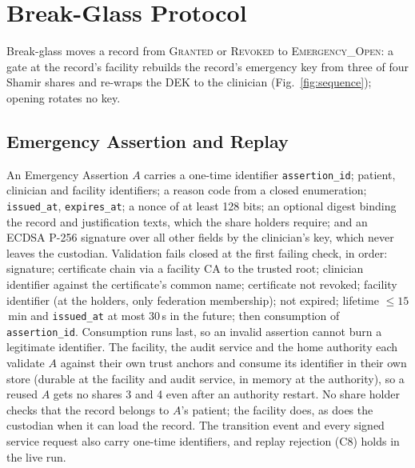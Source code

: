 \section{Break-Glass Protocol}\label{sec:breakglass}




Break-glass moves a record from \textsc{Granted} or \textsc{Revoked} to
\textsc{Emergency\_Open}: a gate at the record's facility rebuilds the
record's emergency key from three of four Shamir shares and re-wraps the DEK
to the clinician (Fig.~\ref{fig:sequence}); opening rotates no key.

\subsection{Emergency Assertion and Replay}

An Emergency Assertion $A$ carries a one-time identifier \texttt{assertion\_\allowbreak id};
patient, clinician and facility identifiers; a reason code from a closed
enumeration; \texttt{issued\_\allowbreak at}, \texttt{expires\_\allowbreak at}; a nonce of at least
128 bits; an optional digest binding the record and justification texts,
which the share holders require; and an ECDSA P-256 signature over all other
fields by the clinician's key, which never leaves the custodian.
Validation fails closed at the first failing check, in order: signature;
certificate chain via a facility CA to the trusted root; clinician
identifier against the certificate's common name; certificate not revoked; facility
identifier (at the holders, only federation membership); not expired; lifetime $\le 15$\,min and \texttt{issued\_\allowbreak at} at
most 30\,s in the future; then consumption of \texttt{assertion\_\allowbreak id}.
Consumption runs last, so an invalid assertion cannot burn a legitimate
identifier.
The facility, the audit service and the home authority each validate $A$
against their own trust anchors and consume its identifier in their own
store (durable at the facility and audit service, in memory at the
authority), so a reused $A$ gets no shares 3 and 4 even after an authority
restart.
No share holder checks that the record belongs to $A$'s patient; the
facility does, as does the custodian when it can load the record.
The transition event and every signed service request also carry one-time
identifiers, and replay rejection (C8) holds in the live run.

